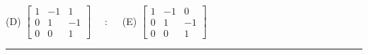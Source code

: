 \documentclass[12pt]{amsart}
\newcommand{\divider}{
  \vspace{-1em} %
  \noindent
  \raisebox{-0.15ex}{\textbullet}%
  \hspace{0.5em}%
  \rule[0.5ex]{0.95\textwidth}{1.0pt}%
  \hspace{0.5em}%
  \raisebox{-0.15ex}{\textbullet}%
  \vspace{0em} %
}
\begin{document}
(D) $\begin{bmatrix} 1 & -1 & 1 \\ 0 & 1 & -1 \\ 0 & 0 & 1 \end{bmatrix}$
$\quad : \quad$
(E) $\begin{bmatrix} 1 & -1 & 0 \\ 0 & 1 & -1 \\ 0 & 0 & 1 \end{bmatrix}$

\bigskip

%
%
%
\divider
\end{document}
